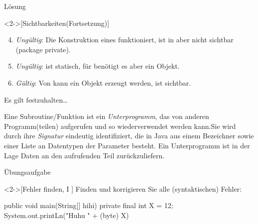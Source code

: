 \begin{frame}[c]{Lösung}
    \addtocounter{solve}{-1}%
    \begin{solve}<2->[Sichtbarkeiten\hfill(Fortsetzung)]
       \begin{enumerate}[<+(1)->]
            \setcounter{enumi}{3}
           \item \emph{Ungültig}: Die Konstruktion eines  funktioniert,  ist in  aber nicht sichtbar (package private).
           \item \emph{Ungültig}:  ist statisch, für  benötigt es aber ein Objekt.
           \item \emph{Gültig}: Von  kann ein Objekt erzeugt werden,  ist  sichtbar.
       \end{enumerate}
    \end{solve}
\end{frame}
\fi

\begin{frame}[c]{Es gilt festzuhalten\ldots}
    \begin{definition}[Subroutinen]
        Eine Subroutine/Funktion ist ein \emph{Unterprogramm},\pause{} das von anderen Programm(teilen) aufgerufen und so wiederverwendet werden kann.\pause{}\medskip\newline Sie wird durch ihre \emph{Signatur} eindeutig identifiziert,\pause{} die in Java aus einem Bezeichner sowie einer Liste an Datentypen der Parameter besteht. Ein Unterprogramm ist in der Lage Daten an den aufrufenden Teil zurückzuliefern.
    \end{definition}
\end{frame}

\ifull
\begin{frame}[c,fragile]{Übungsaufgabe}
    \begin{exercise}<2->[Fehler finden, I ]
        \pause{}Finden und korrigieren Sie alle (syntaktischen) Fehler:\pause{}
        \begin{plainvoid}
public void main(String[] hihi) {
    private final int X = 12;
    System.out.printLn("Huhu " + (byte) X)
}
        \end{plainvoid}
    \end{exercise}
\end{frame}

